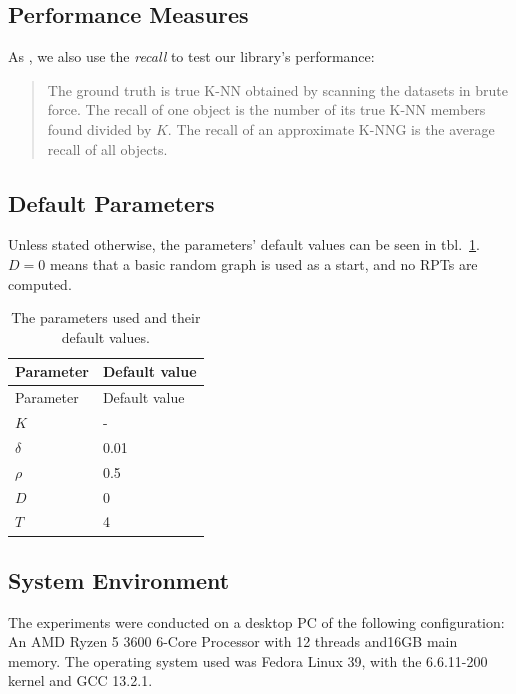 \documentclass[
  10,
  letterpaperpaper,
  twocolumn]{article}
\begin{document}
\subsection{Performance Measures}\label{performance-measures}

As \textcite{dongEfficientKnearestNeighbor2011}, we also use the
\emph{recall} to test our library's performance:

\begin{quote}
The ground truth is true K-NN obtained by scanning the datasets in brute
force. The recall of one object is the number of its true K-NN members
found divided by \(K\). The recall of an approximate K-NNG is the
average recall of all objects.
\end{quote}

\subsection{Default Parameters}\label{default-parameters}

Unless stated otherwise, the parameters' default values can be seen in
tbl.~\ref{tbl:parameters}. \(D=0\) means that a basic random graph is
used as a start, and no RPTs are computed.

\begin{longtable}[]{@{}ll@{}}
\caption{\label{tbl:parameters}The parameters used and their default
values.}\tabularnewline
\toprule\noalign{}
Parameter & Default value \\
\midrule\noalign{}
\endfirsthead
\toprule\noalign{}
Parameter & Default value \\
\midrule\noalign{}
\endhead
\bottomrule\noalign{}
\endlastfoot
\(K\) & - \\
\(\delta\) & 0.01 \\
\(\rho\) & 0.5 \\
\(D\) & 0 \\
\(T\) & 4 \\
\end{longtable}

\subsection{System Environment}\label{system-environment}

The experiments were conducted on a desktop PC of the following
configuration: An AMD Ryzen 5 3600 6-Core Processor with 12 threads
and16GB main memory. The operating system used was Fedora Linux 39, with
the 6.6.11-200 kernel and GCC 13.2.1.
\end{document}
